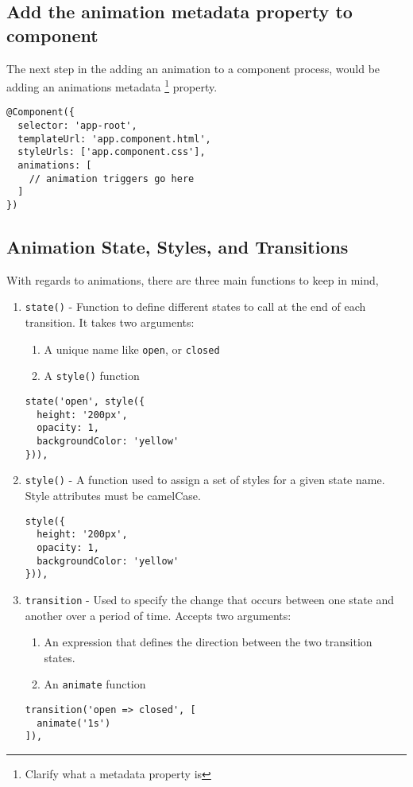 \subsection{Add the animation metadata property to component}
The next step in the adding an animation to a component process, would be 
adding an animations metadata \footnote{Clarify what a metadata property is}
property.

\begin{lstlisting}
@Component({
  selector: 'app-root',
  templateUrl: 'app.component.html',
  styleUrls: ['app.component.css'],
  animations: [
    // animation triggers go here
  ]
})  
\end{lstlisting}

\subsection{ Animation State, Styles, and Transitions }
With regards to animations, there are three main functions to keep in mind, 
\begin{enumerate}
  \item \lstinline{state()} - Function to define different states to call at 
  the end of each transition. It takes two arguments: 
    \begin{enumerate}
      \item A unique name like \lstinline{open}, or \lstinline{closed}
      \item A \lstinline{style()} function 
    \end{enumerate}
    \begin{lstlisting}  
state('open', style({
  height: '200px',
  opacity: 1,
  backgroundColor: 'yellow'
})),
    \end{lstlisting}  
  \item \lstinline{style()} - A function used to assign a set of styles for 
  a given state name. Style attributes must be camelCase.
    \begin{lstlisting}
style({
  height: '200px',
  opacity: 1,
  backgroundColor: 'yellow'
})),
    \end{lstlisting}
  \item \lstinline{transition} - Used to specify the change that occurs 
  between one state and another over a period of time. Accepts two arguments: 
    \begin{enumerate}
      \item An expression that defines the direction between the two 
      transition states. 
      \item An \lstinline{animate} function
    \end{enumerate}
    \begin{lstlisting}
transition('open => closed', [
  animate('1s')
]),
    \end{lstlisting}
\end{enumerate}

